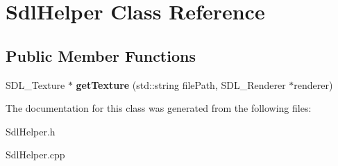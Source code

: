 \hypertarget{class_sdl_helper}{}\section{Sdl\+Helper Class Reference}
\label{class_sdl_helper}
\subsection*{Public Member Functions}
\begin{DoxyCompactItemize}
\item 
\mbox{\label{class_sdl_helper_a8757d5eb4993ff07bb27f4524c0a359b}} 
S\+D\+L\+\_\+\+Texture $\ast$ {\bfseries get\+Texture} (std\+::string file\+Path, S\+D\+L\+\_\+\+Renderer $\ast$renderer)
\end{DoxyCompactItemize}


The documentation for this class was generated from the following files\+:\begin{DoxyCompactItemize}
\item 
Sdl\+Helper.\+h\item 
Sdl\+Helper.\+cpp\end{DoxyCompactItemize}
